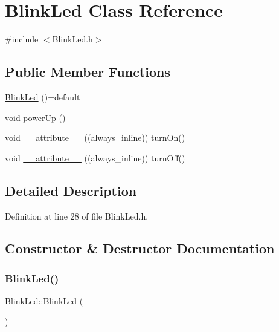 \hypertarget{class_blink_led}{}\section{Blink\+Led Class Reference}
\label{class_blink_led}


{\ttfamily \#include $<$Blink\+Led.\+h$>$}

\subsection*{Public Member Functions}
\begin{DoxyCompactItemize}
\item 
\hyperlink{class_blink_led_a97362f01ff940033431d666f7798dce1}{Blink\+Led} ()=default
\item 
void \hyperlink{class_blink_led_a38fcbc34c6ff8a1083b64bbbb309a54c}{power\+Up} ()
\item 
void \hyperlink{class_blink_led_ae5768d48c161e9150c97e19c369b64de}{\+\_\+\+\_\+attribute\+\_\+\+\_\+} ((always\+\_\+inline)) turn\+On()
\item 
void \hyperlink{class_blink_led_a9f8f662f733e131e6477161ac785f665}{\+\_\+\+\_\+attribute\+\_\+\+\_\+} ((always\+\_\+inline)) turn\+Off()
\end{DoxyCompactItemize}


\subsection{Detailed Description}


Definition at line 28 of file Blink\+Led.\+h.



\subsection{Constructor \& Destructor Documentation}
\mbox{\label{class_blink_led_a97362f01ff940033431d666f7798dce1}} 
\subsubsection{\texorpdfstring{Blink\+Led()}{BlinkLed()}}
{\footnotesize\ttfamily Blink\+Led\+::\+Blink\+Led (\begin{DoxyParamCaption}{ }\end{DoxyParamCaption})\hspace{0.3cm}{\ttfamily [default]}}



